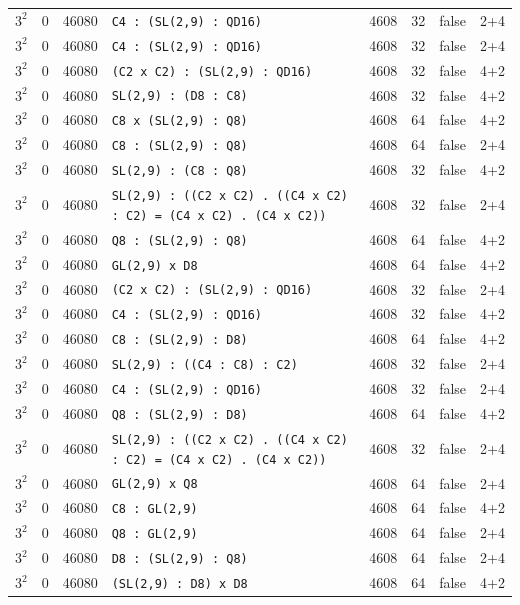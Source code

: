 \begin{longtable}{llrlrrll}
$3^2$ & 0 & 46080 & \texttt{C4 : (SL(2,9) : QD16)} & 4608 & 32 & false & 2+4\\
$3^2$ & 0 & 46080 & \texttt{C4 : (SL(2,9) : QD16)} & 4608 & 32 & false & 2+4\\
$3^2$ & 0 & 46080 & \texttt{(C2 x C2) : (SL(2,9) : QD16)} & 4608 & 32 & false & 4+2\\
$3^2$ & 0 & 46080 & \texttt{SL(2,9) : (D8 : C8)} & 4608 & 32 & false & 4+2\\
$3^2$ & 0 & 46080 & \texttt{C8 x (SL(2,9) : Q8)} & 4608 & 64 & false & 4+2\\
$3^2$ & 0 & 46080 & \texttt{C8 : (SL(2,9) : Q8)} & 4608 & 64 & false & 2+4\\
$3^2$ & 0 & 46080 & \texttt{SL(2,9) : (C8 : Q8)} & 4608 & 32 & false & 4+2\\
$3^2$ & 0 & 46080 & \texttt{SL(2,9) : ((C2 x C2) . ((C4 x C2) : C2) = (C4 x C2) . (C4 x C2))} & 4608 & 32 & false & 2+4\\
$3^2$ & 0 & 46080 & \texttt{Q8 : (SL(2,9) : Q8)} & 4608 & 64 & false & 4+2\\
$3^2$ & 0 & 46080 & \texttt{GL(2,9) x D8} & 4608 & 64 & false & 4+2\\
$3^2$ & 0 & 46080 & \texttt{(C2 x C2) : (SL(2,9) : QD16)} & 4608 & 32 & false & 2+4\\
$3^2$ & 0 & 46080 & \texttt{C4 : (SL(2,9) : QD16)} & 4608 & 32 & false & 4+2\\
$3^2$ & 0 & 46080 & \texttt{C8 : (SL(2,9) : D8)} & 4608 & 64 & false & 4+2\\
$3^2$ & 0 & 46080 & \texttt{SL(2,9) : ((C4 : C8) : C2)} & 4608 & 32 & false & 2+4\\
$3^2$ & 0 & 46080 & \texttt{C4 : (SL(2,9) : QD16)} & 4608 & 32 & false & 2+4\\
$3^2$ & 0 & 46080 & \texttt{Q8 : (SL(2,9) : D8)} & 4608 & 64 & false & 4+2\\
$3^2$ & 0 & 46080 & \texttt{SL(2,9) : ((C2 x C2) . ((C4 x C2) : C2) = (C4 x C2) . (C4 x C2))} & 4608 & 32 & false & 2+4\\
$3^2$ & 0 & 46080 & \texttt{GL(2,9) x Q8} & 4608 & 64 & false & 2+4\\
$3^2$ & 0 & 46080 & \texttt{C8 : GL(2,9)} & 4608 & 64 & false & 4+2\\
$3^2$ & 0 & 46080 & \texttt{Q8 : GL(2,9)} & 4608 & 64 & false & 2+4\\
$3^2$ & 0 & 46080 & \texttt{D8 : (SL(2,9) : Q8)} & 4608 & 64 & false & 2+4\\
$3^2$ & 0 & 46080 & \texttt{(SL(2,9) : D8) x D8} & 4608 & 64 & false & 4+2\\

\end{longtable}
